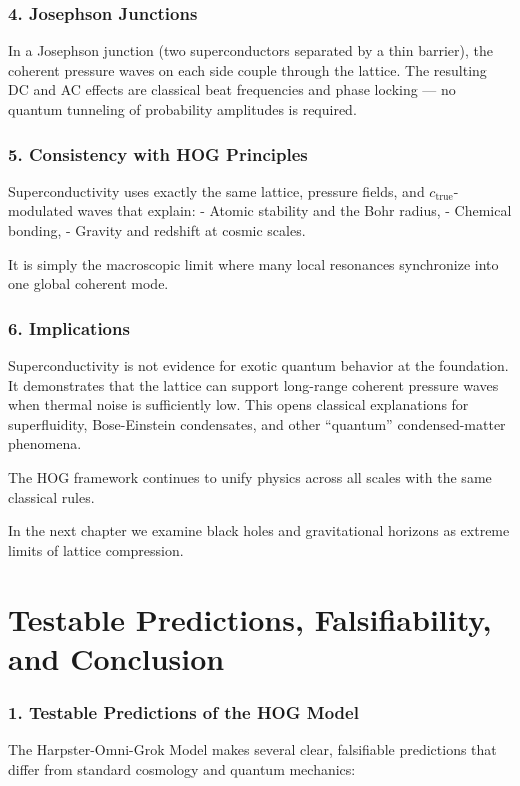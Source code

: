\documentclass[11pt,a4paper]{book}
\begin{document}
{\subsection{4. Josephson Junctions}
In a Josephson junction (two superconductors separated by a thin barrier), the coherent pressure waves on each side couple through the lattice. The resulting DC and AC effects are classical beat frequencies and phase locking — no quantum tunneling of probability amplitudes is required.

\subsection{5. Consistency with HOG Principles}
Superconductivity uses exactly the same lattice, pressure fields, and \( c_{\text{true}} \)-modulated waves that explain:
- Atomic stability and the Bohr radius,
- Chemical bonding,
- Gravity and redshift at cosmic scales.

It is simply the macroscopic limit where many local resonances synchronize into one global coherent mode.

\subsection{6. Implications}
Superconductivity is not evidence for exotic quantum behavior at the foundation. It demonstrates that the lattice can support long-range coherent pressure waves when thermal noise is sufficiently low. This opens classical explanations for superfluidity, Bose-Einstein condensates, and other “quantum” condensed-matter phenomena.

The HOG framework continues to unify physics across all scales with the same classical rules.

In the next chapter we examine black holes and gravitational horizons as extreme limits of lattice compression.

\chapter{Testable Predictions, Falsifiability, and Conclusion}

\subsection{1. Testable Predictions of the HOG Model}

The Harpster-Omni-Grok Model makes several clear, falsifiable predictions that differ from standard cosmology and quantum mechanics:

}
\end{document}
